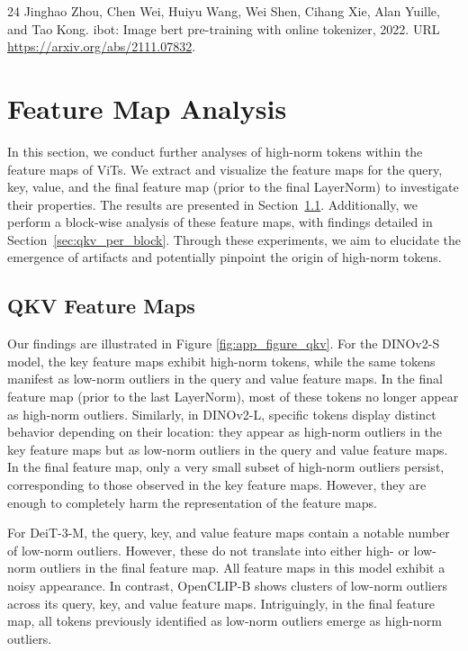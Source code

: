 \documentclass[10pt]{article} \usepackage[preprint]{tmlr}
\begin{document}
\begin{thebibliography}{24}
Jinghao Zhou, Chen Wei, Huiyu Wang, Wei Shen, Cihang Xie, Alan Yuille, and Tao
  Kong.
\newblock ibot: Image bert pre-training with online tokenizer, 2022.
\newblock URL \url{https://arxiv.org/abs/2111.07832}.

\end{thebibliography}
 


\newpage

\appendix
\section{Feature Map Analysis}
In this section, we conduct further analyses of high-norm tokens within the feature maps of ViTs. We extract and visualize the feature maps for the query, key, value, and the final feature map (prior to the final LayerNorm) to investigate their properties. The results are presented in Section~\ref{sec:qkv}. Additionally, we perform a block-wise analysis of these feature maps, with findings detailed in Section~\ref{sec:qkv_per_block}. Through these experiments, we aim to elucidate the emergence of artifacts and potentially pinpoint the origin of high-norm tokens.

\subsection{QKV Feature Maps}
\label{sec:qkv}
Our findings are illustrated in Figure \ref{fig:app_figure_qkv}. For the DINOv2-S model, the key feature maps exhibit high-norm tokens, while the same tokens manifest as low-norm outliers in the query and value feature maps. In the final feature map (prior to the last LayerNorm), most of these tokens no longer appear as high-norm outliers. Similarly, in DINOv2-L, specific tokens display distinct behavior depending on their location: they appear as high-norm outliers in the key feature maps but as low-norm outliers in the query and value feature maps. In the final feature map, only a very small subset of high-norm outliers persist, corresponding to those observed in the key feature maps. However, they are enough to completely harm the representation of the feature maps.

For DeiT-3-M, the query, key, and value feature maps contain a notable number of low-norm outliers. However, these do not translate into either high- or low-norm outliers in the final feature map. All feature maps in this model exhibit a noisy appearance. In contrast, OpenCLIP-B shows clusters of low-norm outliers across its query, key, and value feature maps. Intriguingly, in the final feature map, all tokens previously identified as low-norm outliers emerge as high-norm outliers.
\end{document}
